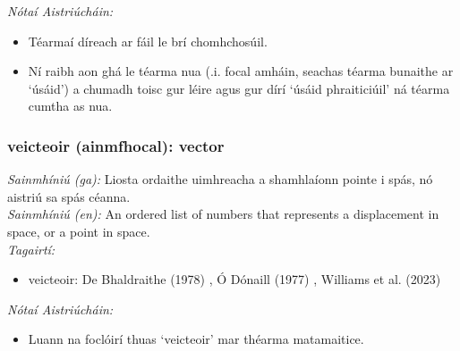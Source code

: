  \noindent \textit{Nótaí Aistriúcháin:}
\begin{itemize}
	\item Téarmaí díreach ar fáil le brí chomhchosúil.
	\item Ní raibh aon ghá le téarma nua (.i. focal amháin, seachas téarma bunaithe ar `úsáid') a chumadh toisc gur léire agus gur dírí `úsáid phraiticiúil' ná téarma cumtha as nua.
\end{itemize}


\subsubsection*{veicteoir (ainmfhocal): vector}
 \noindent \textit{Sainmhíniú (ga):} Liosta ordaithe uimhreacha a shamhlaíonn pointe i spás, nó aistriú sa spás céanna.
\\
 \noindent \textit{Sainmhíniú (en):} An ordered list of numbers that represents a displacement in space, or a point in space.
\\
 \noindent \textit{Tagairtí:}
\begin{itemize}
	\item veicteoir: De Bhaldraithe (1978) \cite{de-bhaldraithe}, Ó Dónaill (1977) \cite{odonaill}, Williams et al. (2023) \cite{storchiste}
\end{itemize}

 \noindent \textit{Nótaí Aistriúcháin:}
\begin{itemize}
	\item Luann na foclóirí thuas `veicteoir' mar théarma matamaitice.
\end{itemize}



